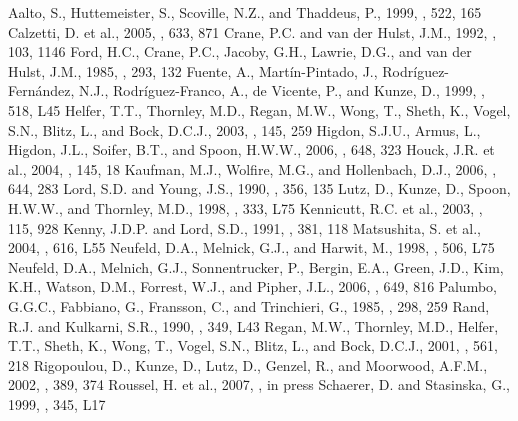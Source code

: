 \documentclass[manuscript]{aastex}
\begin{document}
\begin{thebibliography}{}
 Aalto, S., Huttemeister, S., Scoville, N.Z., and Thaddeus, P., 1999, \aj, 522, 165
 Calzetti, D. et al., 2005, \apj, 633, 871
 Crane, P.C. and van der Hulst, J.M., 1992, \aj, 103, 1146
 Ford, H.C., Crane, P.C., Jacoby, G.H., Lawrie, D.G., and van der Hulst, J.M., 1985, \apj, 293, 132
 Fuente, A., Mart\'{i}n-Pintado, J., Rodr\'{i}guez-Fern\'{a}ndez, N.J., Rodr\'{i}guez-Franco, A., de Vicente, P., and Kunze, D., 1999, \apj, 518, L45 
 Helfer, T.T., Thornley, M.D., Regan, M.W., Wong, T., Sheth, K., Vogel, S.N., Blitz, L., and Bock, D.C.J., 2003, \apjs, 145, 259
 Higdon, S.J.U., Armus, L., Higdon, J.L., Soifer, B.T., and Spoon, H.W.W., 2006, \apj, 648, 323
 Houck, J.R. et al., 2004, \apjs, 145, 18
 Kaufman, M.J., Wolfire, M.G., and Hollenbach, D.J., 2006, \apj, 644, 283 
 Lord, S.D. and Young, J.S., 1990, \apj, 356, 135
 Lutz, D., Kunze, D., Spoon, H.W.W., and Thornley, M.D., 1998, \aap, 333, L75
 Kennicutt, R.C. et al., 2003, \pasp, 115, 928
 Kenny, J.D.P. and Lord, S.D., 1991, \apj, 381, 118
 Matsushita, S. et al., 2004, \apj, 616, L55
 Neufeld, D.A., Melnick, G.J., and Harwit, M., 1998, \apj, 506, L75
 Neufeld, D.A., Melnich, G.J., Sonnentrucker, P., Bergin, E.A., Green, J.D., Kim, K.H., Watson, D.M., Forrest, W.J., and Pipher, J.L., 2006, \apj, 649, 816 
 Palumbo, G.G.C., Fabbiano, G., Fransson, C., and Trinchieri, G., 1985, \apj, 298, 259 
 Rand, R.J. and Kulkarni, S.R., 1990, \apj, 349, L43
 Regan, M.W., Thornley, M.D., Helfer, T.T., Sheth, K., Wong, T., Vogel, S.N., Blitz, L., and Bock, D.C.J., 2001, \apj, 561, 218
 Rigopoulou, D., Kunze, D., Lutz, D., Genzel, R., and Moorwood, A.F.M., 2002, \aap, 389, 374
 Roussel, H. et al., 2007, \apjs, in press
 Schaerer, D. and Stasinska, G., 1999, \aap, 345, L17

\end{thebibliography}
\end{document}
